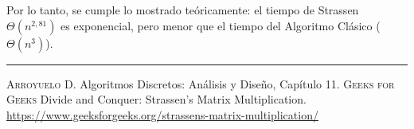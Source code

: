 \documentclass[a4paper,11pt]{article}
\begin{document}
Por lo tanto, se cumple lo mostrado teóricamente: el tiempo de Strassen $\Theta(n^{2,81})$ es exponencial, pero menor que el tiempo del Algoritmo Clásico ($\Theta(n^3)$).
\vfill
\vspace{.5cm}
\hrule
\vspace{.5cm}
\begin{thebibliography}{X}
 \textsc{Arroyuelo D.} Algoritmos Discretos: Análisis y Diseño, Capítulo 11.
 \textsc{Geeks for Geeks} Divide and Conquer: Strassen's Matrix Multiplication. \url{https://www.geeksforgeeks.org/strassens-matrix-multiplication/}
\end{thebibliography}
\end{document}
